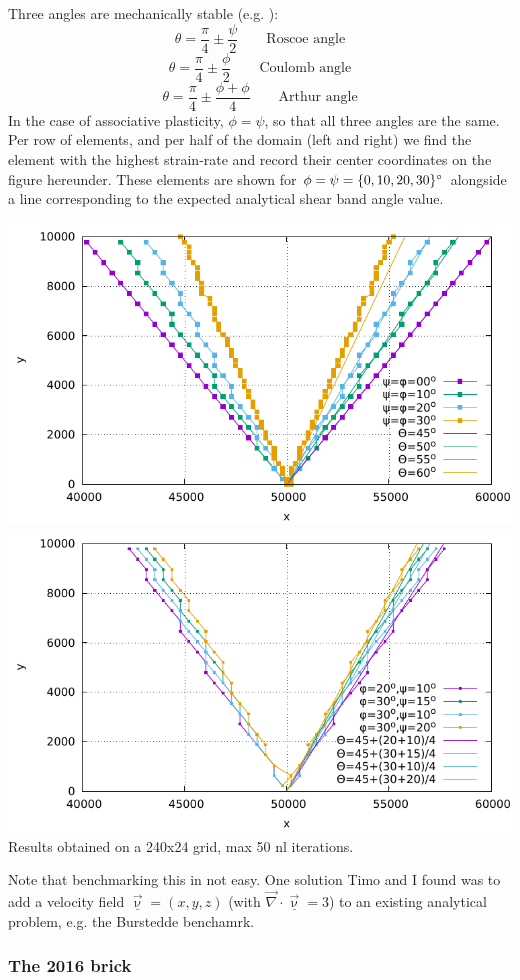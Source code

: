Three angles are mechanically stable (e.g. \cite{kaus10}):
\[
\theta=\frac{\pi}{4}\pm \frac{\psi}{2} \qquad \text{Roscoe angle}
\]
\[
\theta=\frac{\pi}{4}\pm \frac{\phi}{2} \qquad \text{Coulomb angle}
\]
\[
\theta=\frac{\pi}{4}\pm \frac{\phi+\phi}{4} \qquad \text{Arthur angle}
\]
In the case of associative plasticity, $\phi=\psi$, so that all three angles are the same. 
Per row of elements, and per half of the domain (left and right) we find the element
with the highest strain-rate and record their center coordinates on the figure hereunder. 
These elements are shown for $\phi=\psi=\{0,10,20,30\}\degree$ alongside a line corresponding to 
the expected analytical shear band angle value.
\begin{center}
\includegraphics[width=.6\linewidth]{python_codes/fieldstone_39/images/shear_bands}\\
\includegraphics[width=.6\linewidth]{python_codes/fieldstone_39/images/shear_bands_nonass}\\
Results obtained on a 240x24 grid, max 50 nl iterations.
\end{center}



Note that benchmarking this in not easy. One solution Timo and I found was to add a 
velocity field $\underline{\vec\upnu}=(x,y,z)$ (with $\vec\nabla\cdot\underline{\vec\upnu}=3$)
to an existing analytical problem, e.g. the Burstedde benchamrk.

\subsubsection*{The 2016 brick}

